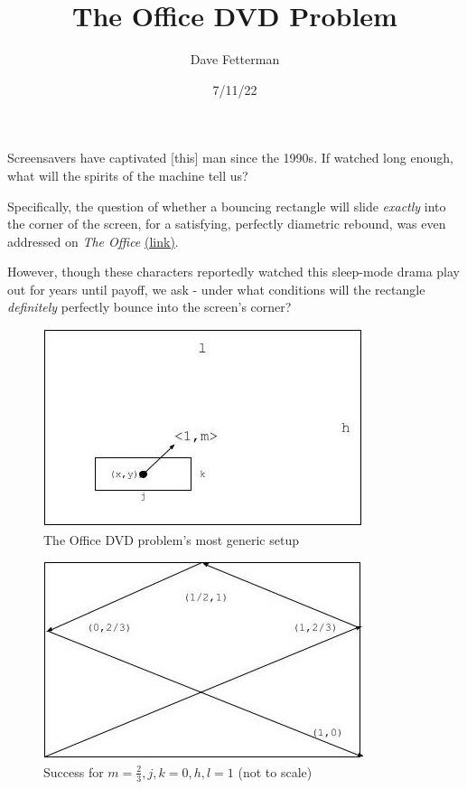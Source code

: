 \documentclass[11pt, oneside]{article} 	%
\title{The Office DVD Problem}
\author{Dave Fetterman}
\affil{Obviously Unemployed}
\date{7/11/22}
\begin{document}
\maketitle

Screensavers have captivated [this] man since the 1990s. If watched long enough, what will the spirits of the machine tell us?

Specifically, the question of whether a bouncing rectangle will slide \emph{exactly} into the corner of the screen, for a satisfying, perfectly diametric rebound, was even addressed on \emph{The Office}
\href{https://www.youtube.com/watch?v=QOtuX0jL85Y}{(link)}.

However, though these characters reportedly watched this sleep-mode drama play out for years until payoff, we ask - under what conditions will the rectangle \emph{definitely} perfectly bounce into the screen's corner?
 
\begin{figure}
\centering
\includegraphics[scale=.5]{setup}
\caption{The Office DVD problem's most generic setup}
\end{figure}


\begin{figure}[!htb]
\centering
\includegraphics[scale=.5]{problem1trajectory}
 \caption{Success for $m = \frac{2}{3}, j, k = 0, h, l = 1$ (not to scale)}
\end{figure}
\end{document}
